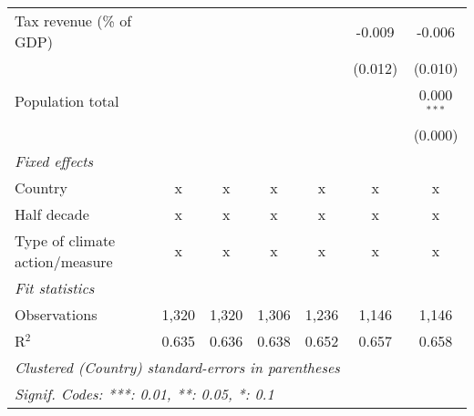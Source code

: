 \begin{tabular}{lcccccc}
   Tax revenue (\% of GDP)                           &              &              &              &         & -0.009      & -0.006\\   
                                                     &              &              &              &         & (0.012)     & (0.010)\\   
   Population total                                  &              &              &              &         &             & 0.000$^{***}$\\   
                                                     &              &              &              &         &             & (0.000)\\   
   \emph{Fixed effects}\\
   Country                                           & x            & x            & x            & x       & x           & x\\  
   Half decade                                       & x            & x            & x            & x       & x           & x\\  
   Type of climate action/measure                    & x            & x            & x            & x       & x           & x\\  
   \midrule \emph{Fit statistics}\\
   Observations                                      & 1,320        & 1,320        & 1,306        & 1,236   & 1,146       & 1,146\\  
   R$^2$                                             & 0.635        & 0.636        & 0.638        & 0.652   & 0.657       & 0.658\\  
   \midrule
   \multicolumn{7}{l}{\emph{Clustered (Country) standard-errors in parentheses}}\\
   \multicolumn{7}{l}{\emph{Signif. Codes: ***: 0.01, **: 0.05, *: 0.1}}\\
\end{tabular}
\par\endgroup


